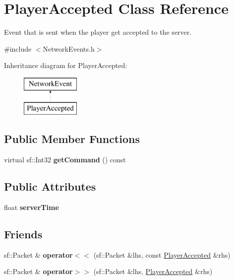 \hypertarget{class_player_accepted}{\section{Player\-Accepted Class Reference}
\label{class_player_accepted}
}


Event that is sent when the player get accepted to the server.  




{\ttfamily \#include $<$Network\-Events.\-h$>$}

Inheritance diagram for Player\-Accepted\-:\begin{figure}[H]
\begin{center}
\leavevmode
\includegraphics[height=2.000000cm]{class_player_accepted}
\end{center}
\end{figure}
\subsection*{Public Member Functions}
\begin{DoxyCompactItemize}
\item 
\hypertarget{class_player_accepted_a7dfa94ad07e560162a563b74a034e72f}{virtual sf\-::\-Int32 {\bfseries get\-Command} () const }\label{class_player_accepted_a7dfa94ad07e560162a563b74a034e72f}

\end{DoxyCompactItemize}
\subsection*{Public Attributes}
\begin{DoxyCompactItemize}
\item 
\hypertarget{class_player_accepted_a495498cb7e240734eb0e26422357f9c8}{float {\bfseries server\-Time}}\label{class_player_accepted_a495498cb7e240734eb0e26422357f9c8}

\end{DoxyCompactItemize}
\subsection*{Friends}
\begin{DoxyCompactItemize}
\item 
\hypertarget{class_player_accepted_ade60d3614fa9f334f0cf8f98efd67377}{sf\-::\-Packet \& {\bfseries operator$<$$<$} (sf\-::\-Packet \&lhs, const \hyperlink{class_player_accepted}{Player\-Accepted} \&rhs)}\label{class_player_accepted_ade60d3614fa9f334f0cf8f98efd67377}

\item 
\hypertarget{class_player_accepted_ad6f078e6ef68cc88b509f86bd3f1c892}{sf\-::\-Packet \& {\bfseries operator$>$$>$} (sf\-::\-Packet \&lhs, \hyperlink{class_player_accepted}{Player\-Accepted} \&rhs)}\label{class_player_accepted_ad6f078e6ef68cc88b509f86bd3f1c892}

\end{DoxyCompactItemize}
